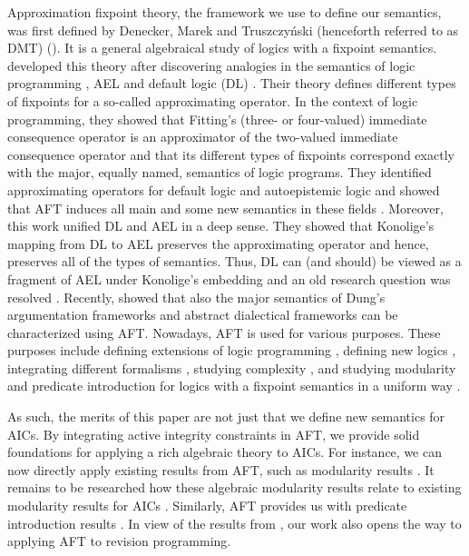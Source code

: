 Approximation fixpoint theory, the framework we use to define our semantics, was first defined by Denecker, Marek and Truszczy\'nski (henceforth referred to as DMT) (\citeyear{DeneckerMT00}). 
It is a general algebraical study of logics with a fixpoint semantics. 
 developed this theory after discovering analogies in the semantics of logic programming , AEL \cite{mo85} and  default logic (DL) \cite{ai/Reiter80}.
Their theory defines different types of fixpoints for a so-called approximating operator.
In the context of logic programming, they showed that Fitting's (three- or four-valued) immediate consequence operator is an approximator of the two-valued immediate consequence operator and that its different types of fixpoints correspond exactly with the  major, equally named, semantics of logic programs. 
They identified  approximating operators for default logic and autoepistemic logic and showed that AFT induces all main and some new semantics in these fields \cite{DeneckerMT03}. 
Moreover, this work unified DL and AEL in a deep sense.
They showed that Konolige's mapping from DL to AEL \cite{Konolige88} preserves the approximating operator and hence, preserves all of the types of semantics.  
Thus, DL can (and should) be viewed as a fragment of AEL under Konolige's embedding and an old research question was resolved \cite{nonmon30/DeneckerMT11}. 
Recently, \citet{journals/ai/Strass13} showed that also the major semantics of Dung's argumentation frameworks  and abstract dialectical frameworks  can be characterized using AFT. 
Nowadays, AFT is used for various purposes.  These purposes include defining extensions of logic programming \cite{lpnmr/AnticEF13}, defining new logics \cite{iclp/BogaertsVDV14}, integrating different formalisms \cite{RR/BiJF14}, studying complexity \cite{kr/StrassW14}, and studying modularity and predicate introduction for logics with a fixpoint semantics in a uniform way \cite{tocl/VennekensGD06,VennekensMWD07a,VennekensMWD07b}. 

As such, the merits of this paper are not just that we define new semantics for AICs. 
By integrating active integrity constraints in AFT, we provide  solid foundations for applying a rich algebraic theory to AICs.
For instance, we can now directly apply existing results from AFT, such as modularity results \cite{tocl/VennekensGD06,tocl/BogaertsVD16}. It remains to be researched how these algebraic modularity results relate to existing modularity results for AICs \cite{foiks/Cruz-Filipe14,iclp/Cruz-Filipe16}. 
Similarly, AFT provides us with predicate introduction results \cite{VennekensMWD07a,VennekensMWD07b}. 
In view of the results from \citet{tplp/CaropreseT11}, our work also opens the way to applying AFT to revision programming.




